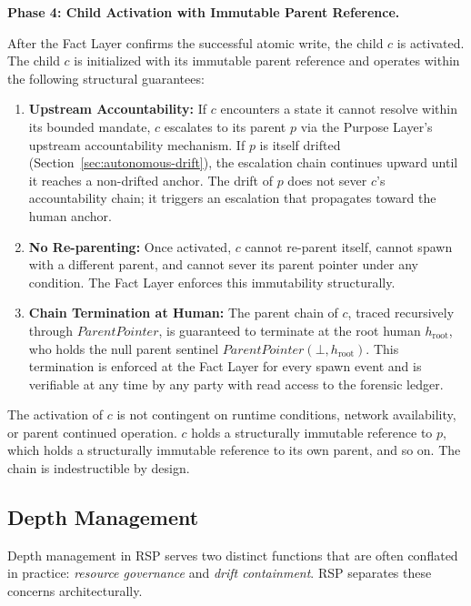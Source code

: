 \bigskip
\noindent\textbf{Phase 4: Child Activation with Immutable Parent Reference.}

After the Fact Layer confirms the successful atomic write, the child $c$ is activated. The child $c$ is initialized with its immutable parent reference and operates within the following structural guarantees:

\begin{enumerate}
    \item \textbf{Upstream Accountability:} If $c$ encounters a state it cannot resolve within its bounded mandate, $c$ escalates to its parent $p$ via the Purpose Layer's upstream accountability mechanism. If $p$ is itself drifted (Section~\ref{sec:autonomous-drift}), the escalation chain continues upward until it reaches a non-drifted anchor. The drift of $p$ does not sever $c$'s accountability chain; it triggers an escalation that propagates toward the human anchor.
    \item \textbf{No Re-parenting:} Once activated, $c$ cannot re-parent itself, cannot spawn with a different parent, and cannot sever its parent pointer under any condition. The Fact Layer enforces this immutability structurally.
    \item \textbf{Chain Termination at Human:} The parent chain of $c$, traced recursively through $ParentPointer$, is guaranteed to terminate at the root human $h_{\text{root}}$, who holds the null parent sentinel $ParentPointer(\bot, h_{\text{root}})$. This termination is enforced at the Fact Layer for every spawn event and is verifiable at any time by any party with read access to the forensic ledger.
\end{enumerate}

The activation of $c$ is not contingent on runtime conditions, network availability, or parent continued operation. $c$ holds a structurally immutable reference to $p$, which holds a structurally immutable reference to its own parent, and so on. The chain is indestructible by design.

\subsection{Depth Management}

Depth management in RSP serves two distinct functions that are often conflated in practice: \emph{resource governance} and \emph{drift containment}. RSP separates these concerns architecturally.

